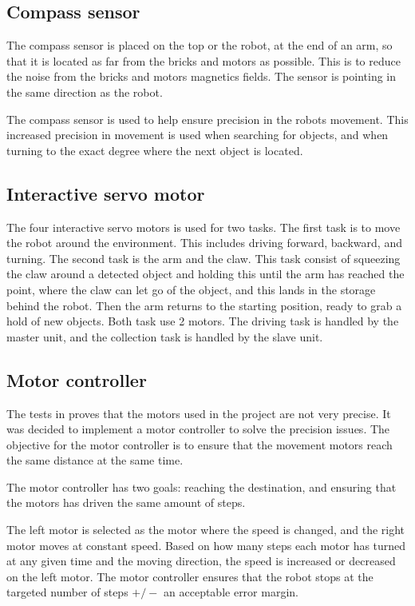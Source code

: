 \subsection{Compass sensor}
The compass sensor is placed on the top or the robot, at the end of an arm, so that it is located as far from the bricks and motors as possible. This is to reduce the noise from the bricks and motors magnetics fields. The sensor is pointing in the same direction as the robot.

The compass sensor is used to help ensure precision in the robots movement. This increased precision in movement is used when searching for objects, and when turning to the exact degree where the next object is located.

\subsection{Interactive servo motor}
The four interactive servo motors is used for two tasks. The first task is to move the robot around the environment. This includes driving forward, backward, and turning. The second task is the arm and the claw. This task consist of squeezing the claw around a detected object and holding this until the arm has reached the point, where the claw can let go of the object, and this lands in the storage behind the robot. Then the arm returns to the starting position, ready to grab a hold of new objects. Both task use 2 motors. The driving task is handled by the master unit, and the collection task is handled by the slave unit.

\subsection{Motor controller}\label{sec:design-motor-controller}
The tests in  proves that the motors used in the project are not very precise. It was decided to implement a motor controller to solve the precision issues. The objective for the motor controller is to ensure that the movement motors reach the same distance at the same time. 

The motor controller has two goals: reaching the destination, and ensuring that the motors has driven the same amount of steps. 

The left motor is selected as the motor where the speed is changed, and the right motor moves at constant speed. Based on how many steps each motor has turned at any given time and the moving direction, the speed is increased or decreased on the left motor. The motor controller ensures that the robot stops at the targeted number of steps $+/-$ an acceptable error margin.


